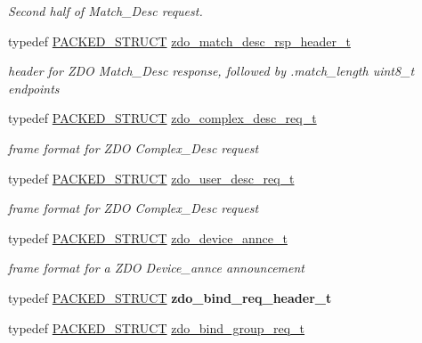 \begin{DoxyCompactItemize}
\begin{DoxyCompactList}\small\item\em Second half of Match\+\_\+\+Desc request. \end{DoxyCompactList}\item 
typedef \hyperlink{group___s_x_a_ga4233297bd31be5c273d4fb0758cc54d7}{P\+A\+C\+K\+E\+D\+\_\+\+S\+T\+R\+U\+CT} \hyperlink{group__zdo_ga92bab7ada78e3865e606ce81bb610935}{zdo\+\_\+match\+\_\+desc\+\_\+rsp\+\_\+header\+\_\+t}
\begin{DoxyCompactList}\small\item\em header for Z\+DO Match\+\_\+\+Desc response, followed by {\ttfamily }.match\+\_\+length uint8\+\_\+t endpoints \end{DoxyCompactList}\item 
typedef \hyperlink{group___s_x_a_ga4233297bd31be5c273d4fb0758cc54d7}{P\+A\+C\+K\+E\+D\+\_\+\+S\+T\+R\+U\+CT} \hyperlink{group__zdo_ga9f34abaa1c2be82e33a7aaf37908f79c}{zdo\+\_\+complex\+\_\+desc\+\_\+req\+\_\+t}
\begin{DoxyCompactList}\small\item\em frame format for Z\+DO Complex\+\_\+\+Desc request \end{DoxyCompactList}\item 
typedef \hyperlink{group___s_x_a_ga4233297bd31be5c273d4fb0758cc54d7}{P\+A\+C\+K\+E\+D\+\_\+\+S\+T\+R\+U\+CT} \hyperlink{group__zdo_ga589d313ae350f36d7b9de7d26c3df977}{zdo\+\_\+user\+\_\+desc\+\_\+req\+\_\+t}
\begin{DoxyCompactList}\small\item\em frame format for Z\+DO Complex\+\_\+\+Desc request \end{DoxyCompactList}\item 
typedef \hyperlink{group___s_x_a_ga4233297bd31be5c273d4fb0758cc54d7}{P\+A\+C\+K\+E\+D\+\_\+\+S\+T\+R\+U\+CT} \hyperlink{group__zdo_ga95dc0a6858fdb8b8237ef6091d31d2ea}{zdo\+\_\+device\+\_\+annce\+\_\+t}
\begin{DoxyCompactList}\small\item\em frame format for a Z\+DO Device\+\_\+annce announcement \end{DoxyCompactList}\item 
typedef \hyperlink{group___s_x_a_ga4233297bd31be5c273d4fb0758cc54d7}{P\+A\+C\+K\+E\+D\+\_\+\+S\+T\+R\+U\+CT} {\bfseries zdo\+\_\+bind\+\_\+req\+\_\+header\+\_\+t}
\item 
typedef \hyperlink{group___s_x_a_ga4233297bd31be5c273d4fb0758cc54d7}{P\+A\+C\+K\+E\+D\+\_\+\+S\+T\+R\+U\+CT} \hyperlink{group__zdo_ga41ab3318ee2bd538e044d6d6e101f376}{zdo\+\_\+bind\+\_\+group\+\_\+req\+\_\+t}

\end{DoxyCompactItemize}
